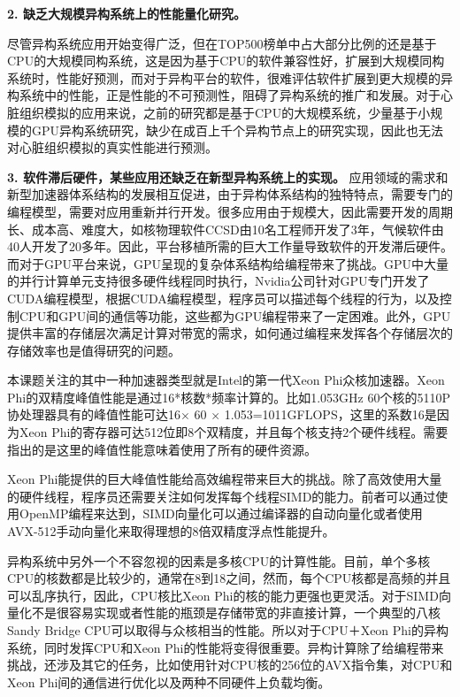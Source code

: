   \textbf{2.  缺乏大规模异构系统上的性能量化研究。}
  
尽管异构系统应用开始变得广泛，但在TOP500榜单中占大部分比例的还是基于CPU的大规模同构系统，这是因为基于CPU的软件兼容性好，扩展到大规模同构系统时，性能好预测，而对于异构平台的软件，很难评估软件扩展到更大规模的异构系统中的性能，正是性能的不可预测性，阻碍了异构系统的推广和发展。对于心脏组织模拟的应用来说，之前的研究都是基于CPU的大规模系统，少量基于小规模的GPU异构系统研究，缺少在成百上千个异构节点上的研究实现，因此也无法对心脏组织模拟的真实性能进行预测。
 
   \textbf{3.  软件滞后硬件，某些应用还缺乏在新型异构系统上的实现。}
 应用领域的需求和新型加速器体系结构的发展相互促进，由于异构体系结构的独特特点，需要专门的编程模型，需要对应用重新并行开发。很多应用由于规模大，因此需要开发的周期长、成本高、难度大，如核物理软件CCSD由10名工程师开发了3年，气候软件由40人开发了20多年。因此，平台移植所需的巨大工作量导致软件的开发滞后硬件。 而对于GPU平台来说，GPU呈现的复杂体系结构给编程带来了挑战。GPU中大量的并行计算单元支持很多硬件线程同时执行，Nvidia公司针对GPU专门开发了CUDA编程模型，根据CUDA编程模型，程序员可以描述每个线程的行为，以及控制CPU和GPU间的通信等功能，这些都为GPU编程带来了一定困难。此外，GPU提供丰富的存储层次满足计算对带宽的需求，如何通过编程来发挥各个存储层次的存储效率也是值得研究的问题。
 
 本课题关注的其中一种加速器类型就是Intel的第一代Xeon Phi众核加速器。Xeon Phi的双精度峰值性能是通过16*核数*频率计算的。比如1.053GHz 60个核的5110P协处理器具有的峰值性能可达16$\times$ 60 $\times$ 1.053=1011GFLOPS，这里的系数16是因为Xeon Phi的寄存器可达512位即8个双精度，并且每个核支持2个硬件线程。需要指出的是这里的峰值性能意味着使用了所有的硬件资源。
 
Xeon Phi能提供的巨大峰值性能给高效编程带来巨大的挑战。除了高效使用大量的硬件线程，程序员还需要关注如何发挥每个线程SIMD的能力。前者可以通过使用OpenMP编程来达到，SIMD向量化可以通过编译器的自动向量化或者使用AVX-512手动向量化来取得理想的8倍双精度浮点性能提升。

异构系统中另外一个不容忽视的因素是多核CPU的计算性能。目前，单个多核CPU的核数都是比较少的，通常在8到18之间，然而，每个CPU核都是高频的并且可以乱序执行，因此，CPU核比Xeon Phi的核的能力更强也更灵活。对于SIMD向量化不是很容易实现或者性能的瓶颈是存储带宽的非直接计算，一个典型的八核Sandy Bridge CPU可以取得与众核相当的性能。所以对于CPU＋Xeon Phi的异构系统，同时发挥CPU和Xeon Phi的性能将变得很重要。异构计算除了给编程带来挑战，还涉及其它的任务，比如使用针对CPU核的256位的AVX指令集，对CPU和Xeon Phi间的通信进行优化以及两种不同硬件上负载均衡。
 
